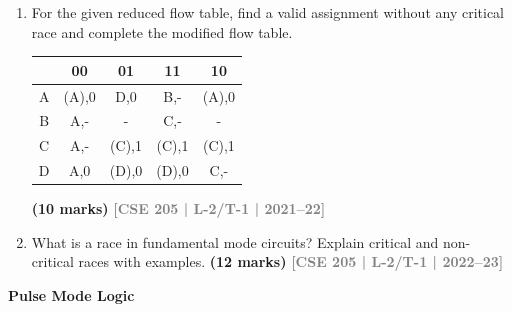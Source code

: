 \documentclass[12pt,a4paper]{article}
\newcommand{\yr}[1]{\hfill\textcolor{gray}{\small\textbf{[#1]}}}
\newcommand{\mk}[1]{\textcolor{orange!70!black}{\small\textbf{(#1 marks)}}}
\newcommand{\subtopic}[2]{%
  \vspace{10pt}
  \noindent\begin{tcolorbox}[colback=#1!8,colframe=#1,boxrule=0.6pt,arc=4pt,
    left=6pt,right=6pt,top=4pt,bottom=4pt]
    \small\bfseries\textcolor{#1}{#2}
  \end{tcolorbox}
  \vspace{2pt}
}
\begin{document}
\begin{enumerate}
\item For the given reduced flow table, find a valid assignment without any critical race and complete the modified flow table.

\begin{center}
  \begin{tabular}{|c|c|c|c|c|}
\hline
  & 00    & 01    & 11    & 10    \\ \hline
A & (A),0 & D,0   & B,-   & (A),0 \\ \hline
B & A,-   & -     & C,-   & -     \\ \hline
C & A,-   & (C),1 & (C),1 & (C),1 \\ \hline
D & A,0   & (D),0 & (D),0 & C,-   \\ \hline
\end{tabular}
\end{center}

\mk{10} \yr{CSE 205 | L-2/T-1 | 2021--22}

\item What is a race in fundamental mode circuits? Explain critical and non-critical races with examples.
\mk{12} \yr{CSE 205 | L-2/T-1 | 2022--23}

\end{enumerate}

\subtopic{cF}{Pulse Mode Logic}
\label{sub:s6-pulse}
\end{document}
